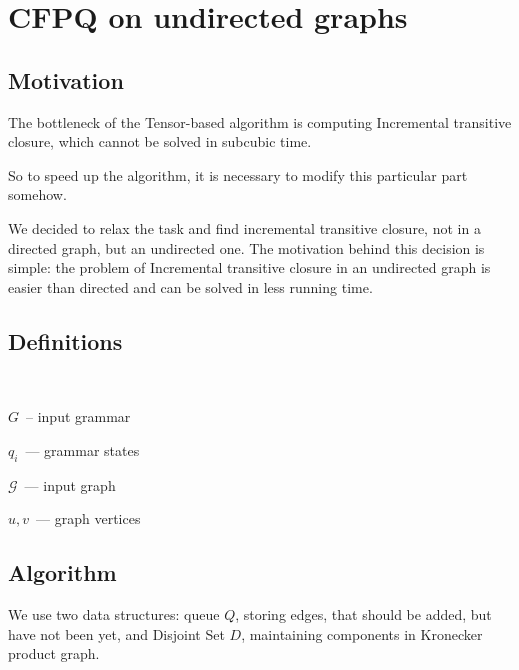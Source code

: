 \section{CFPQ on undirected graphs}

\subsection{Motivation}

The bottleneck of the Tensor-based algorithm is computing Incremental transitive closure, which cannot be solved in subcubic 
time.

So to speed up the algorithm, it is necessary to modify this particular part somehow.

We decided to relax the task and find incremental transitive closure, not in a directed graph, but an undirected one. The motivation behind this decision is simple: the problem of Incremental transitive closure in an undirected graph is easier than directed and can be solved in less running time.

\subsection{Definitions} ~


\textit{\color{dkgreen}{\# define}} $G$~-- input grammar

\textit{\color{dkgreen}{\# define}} $q_i$~--- grammar states

\textit{\color{dkgreen}{\# define}} $\mathcal{G}$~--- input graph

\textit{\color{dkgreen}{\# define}} $u, v$~--- graph vertices

\subsection{Algorithm}



We use two data structures: queue $Q$, storing edges, that should be added, but have not been yet, and Disjoint Set $D$, maintaining components in Kronecker product graph.


